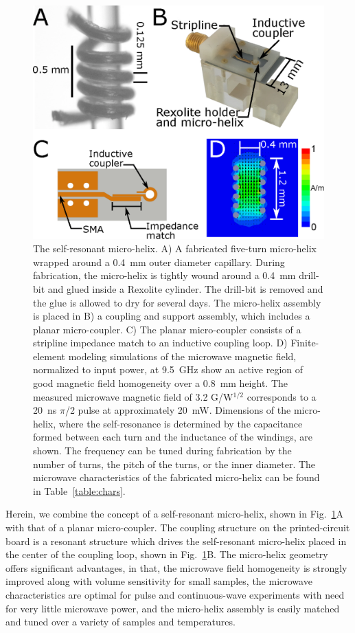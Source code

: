 \begin{figure}[htbp]
\centering
 \includegraphics{Kapitel/Ch4-Images/01-MicroHelixHolder_Big2.eps}
 \caption[The self-resonant micro-helix.]{ The self-resonant micro-helix. A) A fabricated five-turn micro-helix wrapped around a 0.4~mm outer diameter capillary. During fabrication, the micro-helix is tightly wound around a 0.4~mm drill-bit and glued inside a Rexolite cylinder. The drill-bit is removed and the glue is allowed to dry for several days. The micro-helix assembly is placed in B) a coupling and support assembly, which includes a planar micro-coupler. C) The planar micro-coupler consists of a stripline impedance match to an inductive coupling loop. D) Finite-element modeling simulations of the microwave magnetic field, normalized to input power, at 9.5~GHz show an active region of good magnetic field homogeneity over a 0.8~mm height. The measured microwave magnetic field of 3.2 G/W$^{1/2}$ corresponds to a 20~ns $\pi$/2 pulse at approximately 20~mW. Dimensions of the micro-helix, where the self-resonance is determined by the capacitance formed between each turn and the inductance of the windings, are shown. The frequency can be tuned during fabrication by the number of turns, the pitch of the turns, or the inner diameter. The microwave characteristics of the fabricated micro-helix can be found in Table~\ref{table:chars}.}
 \label{fig:fabricated}
\end{figure}

Herein, we combine the concept of a self-resonant micro-helix, shown in Fig.~\ref{fig:fabricated}A with that of a planar micro-coupler. The coupling structure on the printed-circuit board is a resonant structure which drives the self-resonant micro-helix placed in the center of the coupling loop\cite{coupling2016}, shown in Fig.~\ref{fig:fabricated}B. The micro-helix geometry offers significant advantages, in that, the microwave field homogeneity is strongly improved along with volume sensitivity for small samples, the microwave characteristics are optimal for pulse and continuous-wave experiments with need for very little microwave power, and the micro-helix assembly is easily matched and tuned over a variety of samples and temperatures.

